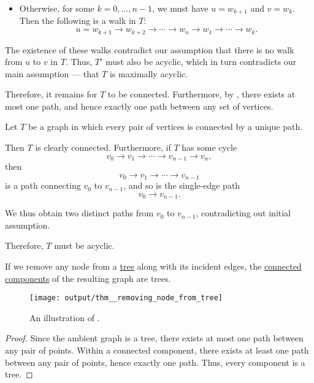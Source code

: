 \begin{defproof}
\begin{itemize}
    \item Otherwise, for some \( k = 0, \ldots, n - 1 \), we must have \( u = w_{k+1} \) and \( v = w_k \). Then the following is a walk in \( T \):
    \begin{equation*}
      u = w_{k+1} \to w_{k+2} \to \cdots \to w_n \to w_1 \to \cdots \to w_k.
    \end{equation*}
  \end{itemize}

  The existence of these walks contradict our assumption that there is no walk from \( u \) to \( v \) in \( T \). Thus, \( T' \) must also be acyclic, which in turn contradicts our main assumption --- that \( T \) is maximally acyclic.

  Therefore, it remains for \( T \) to be connected. Furthermore, by , there exists at most one path, and hence exactly one path between any set of vertices.

   Let \( T \) be a graph in which every pair of vertices is connected by a unique path.

  Then \( T \) is clearly connected. Furthermore, if \( T \) has some cycle
  \begin{equation*}
    v_0 \to v_1 \to \cdots \to v_{n-1} \to v_n,
  \end{equation*}
  then
  \begin{equation*}
    v_0 \to v_1 \to \cdots \to v_{n-1}
  \end{equation*}
  is a path connecting \( v_0 \) to \( v_{n-1} \), and so is the single-edge path
  \begin{equation*}
    v_0 \to v_{n-1}.
  \end{equation*}

  We thus obtain two distinct paths from \( v_0 \) to \( v_{n-1} \), contradicting out initial assumption.

  Therefore, \( T \) must be acyclic.
\end{defproof}

\begin{lemma}\label{thm:removing_node_from_tree}
  If we remove any node from a \hyperref[def:tree]{tree} along with its incident edges, the \hyperref[def:graph_connected_component]{connected components} of the resulting graph are trees.

  \begin{figure}[!ht]
    \centering
    \texttt{[image: output/thm\_\_removing\_node\_from\_tree]}
    \caption{An illustration of .}\label{fig:thm:removing_node_from_tree}
  \end{figure}
\end{lemma}
\begin{proof}
  Since the ambient graph is a tree, there exists at most one path between any pair of points. Within a connected component, there exists at least one path between any pair of points, hence exactly one path. Thus, every component is a tree.
\end{proof}

